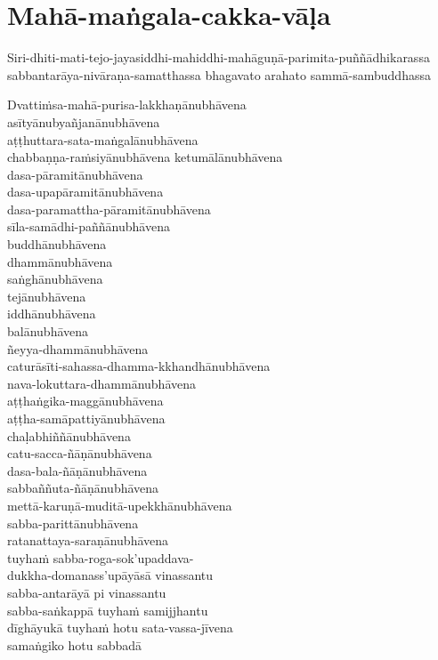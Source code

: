 \section{Mahā-maṅgala-cakka-vāḷa}


Siri-dhiti-mati-tejo-jayasiddhi-mahiddhi-mahāguṇā-parimita-puññādhikarassa
sabbantarāya-nivāraṇa-samatthassa bhagavato arahato sammā-sambuddhassa

Dvattiṁsa-mahā-purisa-lakkhaṇānubhāvena\\
asītyānubyañjanānubhāvena\\
aṭṭhuttara-sata-maṅgalānubhāvena\\
chabbaṇṇa-raṁsiyānubhāvena ketumālānubhāvena\\
dasa-pāramitānubhāvena\\
dasa-upapāramitānubhāvena\\
dasa-paramattha-pāramitānubhāvena\\
sīla-samādhi-paññānubhāvena\\
buddhānubhāvena\\
dhammānubhāvena\\
saṅghānubhāvena\\
tejānubhāvena\\
iddhānubhāvena\\
balānubhāvena\\
ñeyya-dhammānubhāvena\\
caturāsīti-sahassa-dhamma-kkhandhānubhāvena\\
nava-lokuttara-dhammānubhāvena\\
aṭṭhaṅgika-maggānubhāvena\\
aṭṭha-samāpattiyānubhāvena\\
chaḷabhiññānubhāvena\\
catu-sacca-ñāṇānubhāvena\\
dasa-bala-ñāṇānubhāvena\\
sabbaññuta-ñāṇānubhāvena\\
mettā-karuṇā-muditā-upekkhānubhāvena\\
sabba-parittānubhāvena\\
ratanattaya-saraṇānubhāvena\\
tuyhaṁ sabba-roga-sok'upaddava-\\ dukkha-domanass'upāyāsā vinassantu\\
sabba-antarāyā pi vinassantu\\
sabba-saṅkappā tuyhaṁ samijjhantu\\
dīghāyukā tuyhaṁ hotu sata-vassa-jīvena\\
samaṅgiko hotu sabbadā

